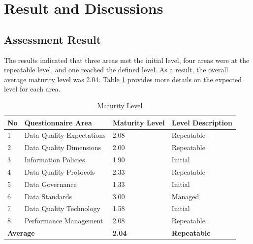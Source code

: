 \documentclass[conference]{IEEEtran}
\begin{document}
\section{Result and Discussions}
\subsection{Assessment Result}
The results indicated that three areas met the initial level, four areas were at the repeatable level, and one reached the defined level. As a result, the overall average maturity level was 2.04. Table \ref{tab:maturity-level} provides more details on the expected level for each area.

\begin{table}[H]
\caption{Maturity Level}
\label{tab:maturity-level}
\centering
\begin{tabular}{|p{0.3cm}|p{3cm}|p{1cm}|p{2cm}|}
\hline
\textbf{No} & \textbf{Questionnaire Area} & \textbf{Maturity Level}&\textbf{Level Description} \\
\hline
1 & Data Quality Expectations & 2.08 & Repeatable\\
\hline
2 & Data Quality Dimensions & 2.00 & Repeatable\\
\hline
3 & Information Policies & 1.90 & Initial\\
\hline
4 & Data Quality Protocols & 2.33 & Repeatable \\
\hline
5 & Data Governance & 1.33 & Initial \\
\hline
6 & Data Standards & 3.00 & Managed \\
\hline
7 & Data Quality Technology & 1.58 & Initial\\
\hline
8 & Performance Management & 2.08 & Repeatable\\
\hline
\multicolumn{2}{|l|}{\textbf{Average}} & \textbf{2.04}& \textbf{Repeatable} \\
\hline
\end{tabular}
\end{table}
\end{document}
